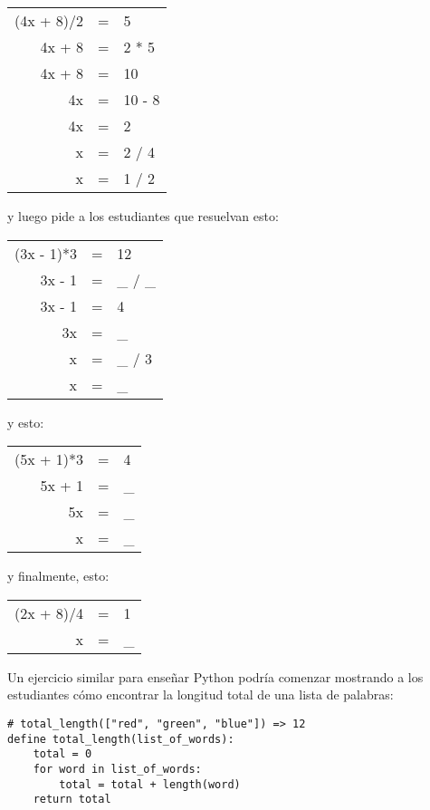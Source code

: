 {\begin{center}
\begin{tabular}{rcl}
  (4x + 8)/2	& = &	5	\\
  4x + 8	& = &	2 * 5	\\
  4x + 8	& = &	10	\\
  4x		& = &	10 - 8	\\
  4x		& = &	2	\\
  x		& = &	2 / 4	\\
  x		& = &	1 / 2
\end{tabular}
\end{center}

\noindent
y luego pide a los estudiantes que resuelvan esto:

\begin{center}
\begin{tabular}{rcl}
  (3x - 1)*3	& = &	12	\\
  3x - 1	& = &	\_ / \_	\\
  3x - 1	& = &	4	\\
  3x		& = &	\_	\\
  x		& = &	\_ / 3	\\
  x		& = &	\_
\end{tabular}
\end{center}

\noindent
y esto:

\begin{center}
\begin{tabular}{rcl}
  (5x + 1)*3	& = &	4	\\
  5x + 1	& = &	\_ 	\\
  5x		& = &	\_ 	\\
  x		& = &	\_
\end{tabular}
\end{center}

\noindent
y finalmente, esto:

\begin{center}
\begin{tabular}{rcl}
  (2x + 8)/4	& = &	1	\\
   x		& = &	\_
\end{tabular}
\end{center}

Un ejercicio similar para enseñar Python podría comenzar mostrando a los estudiantes 
cómo encontrar la longitud total de una lista de palabras:

\begin{verbatim}
# total_length(["red", "green", "blue"]) => 12
define total_length(list_of_words):
    total = 0
    for word in list_of_words:
        total = total + length(word)
    return total
\end{verbatim}

}

